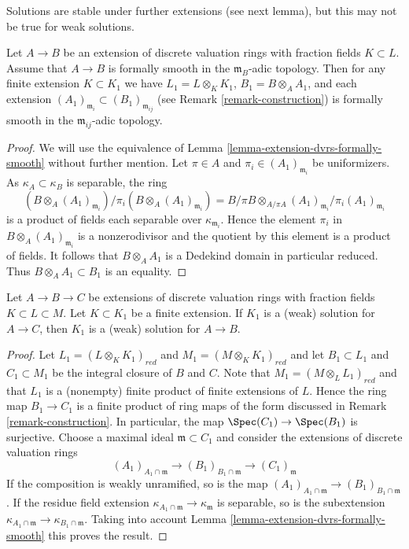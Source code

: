 \noindent
Solutions are stable under further extensions (see next lemma), but this may
not be true for weak solutions.

\begin{lemma}
\label{lemma-formally-smooth-goes-up}
Let $A \to B$ be an extension of discrete valuation rings with fraction fields
$K \subset L$. Assume that $A \to B$ is formally smooth in the
$\mathfrak m_B$-adic topology. Then for any finite extension $K \subset K_1$
we have $L_1 = L \otimes_K K_1$, $B_1 = B \otimes_A A_1$, and each extension
$(A_1)_{\mathfrak m_i} \subset (B_1)_{\mathfrak m_{ij}}$ (see
Remark \ref{remark-construction}) is formally smooth in the
$\mathfrak m_{ij}$-adic topology.
\end{lemma}

\begin{proof}
We will use the equivalence of Lemma \ref{lemma-extension-dvrs-formally-smooth}
without further mention. Let $\pi \in A$ and $\pi_i \in (A_1)_{\mathfrak m_i}$
be uniformizers. As $\kappa_A \subset \kappa_B$ is separable, the ring
$$
(B \otimes_A (A_1)_{\mathfrak m_i})/\pi_i (B \otimes_A (A_1)_{\mathfrak m_i}) =
B/\pi B \otimes_{A/\pi A} (A_1)_{\mathfrak m_i}/\pi_i (A_1)_{\mathfrak m_i}
$$
is a product of fields each separable over $\kappa_{\mathfrak m_i}$.
Hence the element $\pi_i$ in $B \otimes_A (A_1)_{\mathfrak m_i}$
is a nonzerodivisor and the quotient by this element is a product of fields.
It follows that $B \otimes_A A_1$ is a Dedekind domain in particular
reduced. Thus $B \otimes_A A_1 \subset B_1$ is an equality.
\end{proof}

\begin{lemma}
\label{lemma-solutions-go-down}
Let $A \to B \to C$ be extensions of discrete valuation rings with fraction
fields $K \subset L \subset M$. Let $K \subset K_1$ be a finite extension.
If $K_1$ is a (weak) solution for $A \to C$, then $K_1$ is a (weak) solution
for $A \to B$.
\end{lemma}

\begin{proof}
Let $L_1 = (L \otimes_K K_1)_{red}$ and $M_1 = (M \otimes_K K_1)_{red}$
and let $B_1 \subset L_1$ and $C_1 \subset M_1$ be the integral closure
of $B$ and $C$. Note that $M_1 = (M \otimes_L L_1)_{red}$ and that $L_1$
is a (nonempty) finite product of finite extensions of $L$. Hence the
ring map $B_1 \to C_1$ is a finite product of ring maps of the form discussed
in Remark \ref{remark-construction}. In particular, the map
$\Spec(C_1) \to \Spec(B_1)$ is surjective. Choose a maximal ideal
$\mathfrak m \subset C_1$ and consider the extensions of discrete
valuation rings
$$
(A_1)_{A_1 \cap \mathfrak m} \to
(B_1)_{B_1 \cap \mathfrak m} \to
(C_1)_\mathfrak m
$$
If the composition is weakly unramified, so is the map
$(A_1)_{A_1 \cap \mathfrak m} \to (B_1)_{B_1 \cap \mathfrak m}$.
If the residue field extension
$\kappa_{A_1 \cap \mathfrak m} \to \kappa_\mathfrak m$ is separable,
so is the subextension
$\kappa_{A_1 \cap \mathfrak m} \to \kappa_{B_1 \cap \mathfrak m}$.
Taking into account Lemma \ref{lemma-extension-dvrs-formally-smooth}
this proves the result.
\end{proof}

